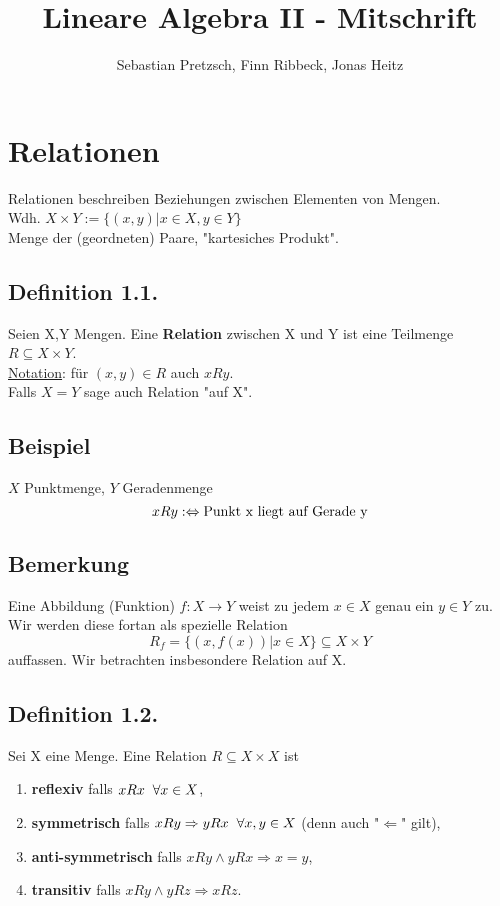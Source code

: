 \documentclass[a4paper,twoside]{article}
\newcommand{\tn}[1]{\textnormal {#1}}
\begin{document}
\title{Lineare Algebra II - Mitschrift}
\author{Sebastian Pretzsch, Finn Ribbeck, Jonas Heitz}
\maketitle
\section{Relationen}
Relationen beschreiben Beziehungen zwischen Elementen von Mengen. \\
Wdh. $X{\times}Y := \{(x,y) | x \in X, y \in Y\}$ \\
Menge der (geordneten) Paare, "kartesiches Produkt".

\subsection*{Definition 1.1.}
Seien X,Y Mengen. Eine \textbf{Relation} zwischen X und Y ist eine Teilmenge $R \subseteq X{\times}Y$. \\
\underline{Notation}: für $(x,y)\in R$ auch $xRy$. \\
Falls $X=Y$ sage auch Relation "auf X".

\subsection*{Beispiel}
$X$ Punktmenge, $Y$ Geradenmenge
$$xRy :\Leftrightarrow \tn{Punkt x liegt auf Gerade y}$$

\subsection*{Bemerkung}
Eine Abbildung (Funktion) $f:X{\to}Y$ weist zu jedem $x\in X$ genau ein $
y\in Y$ zu. \\
Wir werden diese fortan als spezielle Relation
$$R_f = \{(x, f(x)) | x\in X\} \subseteq X{\times}Y$$
auffassen. Wir betrachten insbesondere Relation auf X.

\subsection*{Definition 1.2.}
Sei X eine Menge. Eine Relation $R \subseteq X{\times}X$ ist
\begin{enumerate}[label=(\alph*)]
\item \textbf{reflexiv} falls $xRx \hspace*{2mm}\forall x\in X$,
\item \textbf{symmetrisch} falls $xRy \Rightarrow yRx \hspace*{2mm}\forall x,y\in X$ (denn auch "$\Leftarrow$" gilt),
\item \textbf{anti-symmetrisch} falls $xRy \land yRx \Rightarrow x=y$,
\item \textbf{transitiv} falls $xRy \land yRz \Rightarrow xRz$.
\end{enumerate}
\end{document}
